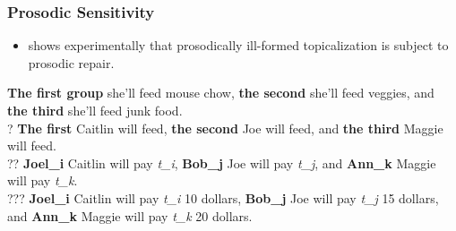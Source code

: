\documentclass[hyperref={pdfpagelabels=false}]{beamer}
\begin{document}
\begin{frame}
\frametitle{Prosodic Sensitivity}
\begin{itemize}
\item \citet{speyer2008, speyer2010} shows experimentally that prosodically ill-formed topicalization is subject to prosodic repair.
\end{itemize}
	\begin{exe}

	\ex  \textbf{The first group} she'll feed mouse chow, \textbf{the second} she'll feed veggies, and \textbf{the third} she'll feed  junk food.\\

	\ex  ? \textbf{The first} Caitlin will feed, \textbf{the second} Joe will feed, and \textbf{the third} Maggie will feed. \\

	\ex  ?? \textbf{Joel_i} Caitlin will pay \textsl{t_i}, \textbf{Bob_j} Joe will pay \textsl{t_j}, and \textbf{Ann_k} Maggie will pay \textsl{t_k}. \\
	
	\ex  ??? \textbf{Joel_i} Caitlin will pay \textsl{t_i} 10 dollars, \textbf{Bob_j} Joe will pay \textsl{t_j} 15 dollars, and \textbf{Ann_k} Maggie will pay \textsl{t_k} 20 dollars. \\

	\end{exe}
	
\end{frame}
\end{document}
